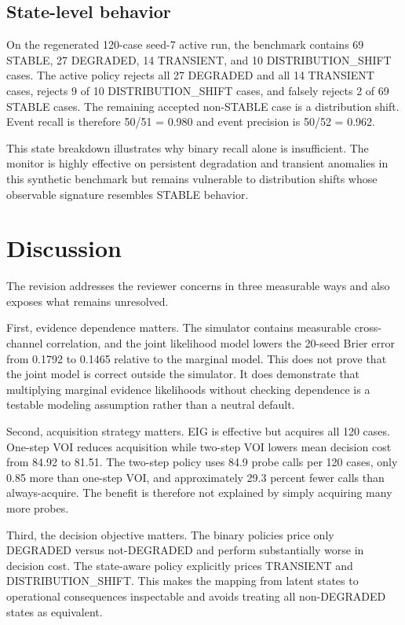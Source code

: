 \documentclass{article}
\begin{document}
\subsection{State-level behavior}

On the regenerated 120-case seed-7 active run, the benchmark contains 69 STABLE, 27 DEGRADED, 14 TRANSIENT, and 10 DISTRIBUTION\_SHIFT cases. The active policy rejects all 27 DEGRADED and all 14 TRANSIENT cases, rejects 9 of 10 DISTRIBUTION\_SHIFT cases, and falsely rejects 2 of 69 STABLE cases. The remaining accepted non-STABLE case is a distribution shift. Event recall is therefore 50/51 = 0.980 and event precision is 50/52 = 0.962.

This state breakdown illustrates why binary recall alone is insufficient. The monitor is highly effective on persistent degradation and transient anomalies in this synthetic benchmark but remains vulnerable to distribution shifts whose observable signature resembles STABLE behavior.

\section{Discussion}

The revision addresses the reviewer concerns in three measurable ways and also exposes what remains unresolved.

First, evidence dependence matters. The simulator contains measurable cross-channel correlation, and the joint likelihood model lowers the 20-seed Brier error from 0.1792 to 0.1465 relative to the marginal model. This does not prove that the joint model is correct outside the simulator. It does demonstrate that multiplying marginal evidence likelihoods without checking dependence is a testable modeling assumption rather than a neutral default.

Second, acquisition strategy matters. EIG is effective but acquires all 120 cases. One-step VOI reduces acquisition while two-step VOI lowers mean decision cost from 84.92 to 81.51. The two-step policy uses 84.9 probe calls per 120 cases, only 0.85 more than one-step VOI, and approximately 29.3 percent fewer calls than always-acquire. The benefit is therefore not explained by simply acquiring many more probes.

Third, the decision objective matters. The binary policies price only DEGRADED versus not-DEGRADED and perform substantially worse in decision cost. The state-aware policy explicitly prices TRANSIENT and DISTRIBUTION\_SHIFT. This makes the mapping from latent states to operational consequences inspectable and avoids treating all non-DEGRADED states as equivalent.
\end{document}
